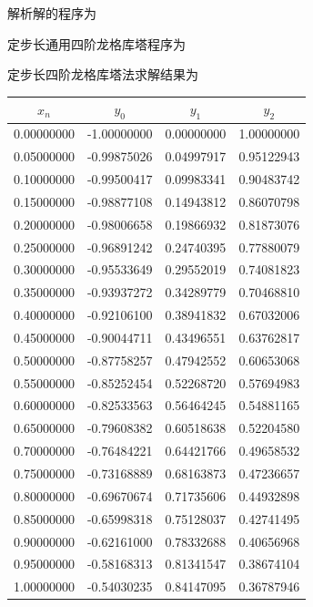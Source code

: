 解析解的程序为



定步长通用四阶龙格库塔程序为



定步长四阶龙格库塔法求解结果为

\begin{center}
\begin{tabular}{c|c|c|c}
	      $x_n$ 	&	    $ y_0$	       &         $y_1$	    &          $y_2$\\
	      \hline
          0.00000000        &-1.00000000         &0.00000000         &1.00000000\\
          0.05000000        &-0.99875026         &0.04997917         &0.95122943\\
          0.10000000        &-0.99500417         &0.09983341         &0.90483742\\
          0.15000000        &-0.98877108         &0.14943812         &0.86070798\\
          0.20000000        &-0.98006658         &0.19866932         &0.81873076\\
          0.25000000        &-0.96891242         &0.24740395         &0.77880079\\
          0.30000000        &-0.95533649         &0.29552019         &0.74081823\\
          0.35000000        &-0.93937272         &0.34289779         &0.70468810\\
          0.40000000        &-0.92106100         &0.38941832         &0.67032006\\
          0.45000000        &-0.90044711         &0.43496551         &0.63762817\\
          0.50000000        &-0.87758257         &0.47942552         &0.60653068\\
          0.55000000        &-0.85252454         &0.52268720         &0.57694983\\
          0.60000000        &-0.82533563         &0.56464245         &0.54881165\\
          0.65000000        &-0.79608382         &0.60518638         &0.52204580\\
          0.70000000        &-0.76484221         &0.64421766         &0.49658532\\
          0.75000000        &-0.73168889         &0.68163873         &0.47236657\\
          0.80000000        &-0.69670674         &0.71735606         &0.44932898\\
          0.85000000        &-0.65998318         &0.75128037         &0.42741495\\
          0.90000000        &-0.62161000         &0.78332688         &0.40656968\\
          0.95000000        &-0.58168313         &0.81341547         &0.38674104\\
          1.00000000        &-0.54030235         &0.84147095         &0.36787946\\
\end{tabular}
\end{center}

